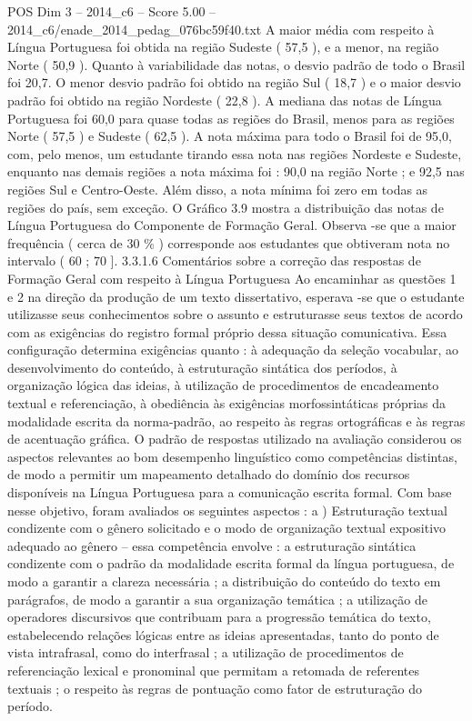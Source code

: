 \begin{textsample}{POS Dim 3 – 2014\_c6 – Score 5.00 – 2014\_c6/enade\_2014\_pedag\_076bc59f40.txt}
A maior média com respeito à Língua Portuguesa foi obtida na região Sudeste ( 57,5 ), e a menor, na região Norte ( 50,9 ).
Quanto à variabilidade das notas, o desvio padrão de todo o Brasil foi 20,7.
O menor desvio padrão foi obtido na região Sul ( 18,7 ) e o maior desvio padrão foi obtido na região Nordeste ( 22,8 ).
A mediana das notas de Língua Portuguesa foi 60,0 para quase todas as regiões do Brasil, menos para as regiões Norte ( 57,5 ) e Sudeste ( 62,5 ).
A nota máxima para todo o Brasil foi de 95,0, com, pelo menos, um estudante tirando essa nota nas regiões Nordeste e Sudeste, enquanto nas demais regiões a nota máxima foi : 90,0 na região Norte ; e 92,5 nas regiões Sul e Centro-Oeste.
Além disso, a nota mínima foi zero em todas as regiões do país, sem exceção.
O Gráfico 3.9 mostra a distribuição das notas de Língua Portuguesa do Componente de Formação Geral.
Observa -se que a maior frequência ( cerca de 30 \% ) corresponde aos estudantes que obtiveram nota no intervalo ( 60 ; 70 ]. 3.3.1.6 Comentários sobre a correção das respostas de Formação Geral com respeito à Língua Portuguesa Ao encaminhar as questões 1 e 2 na direção da produção de um texto dissertativo, esperava -se que o estudante utilizasse seus conhecimentos sobre o assunto e estruturasse seus textos de acordo com as exigências do registro formal próprio dessa situação comunicativa.
Essa configuração determina exigências quanto : à adequação da seleção vocabular, ao desenvolvimento do conteúdo, à estruturação sintática dos períodos, à organização lógica das ideias, à utilização de procedimentos de encadeamento textual e referenciação, à obediência às exigências morfossintáticas próprias da modalidade escrita da norma-padrão, ao respeito às regras ortográficas e às regras de acentuação gráfica.
O padrão de respostas utilizado na avaliação considerou os aspectos relevantes ao bom desempenho linguístico como competências distintas, de modo a permitir um mapeamento detalhado do domínio dos recursos disponíveis na Língua Portuguesa para a comunicação escrita formal.
Com base nesse objetivo, foram avaliados os seguintes aspectos : a ) Estruturação textual condizente com o gênero solicitado e o modo de organização textual expositivo adequado ao gênero – essa competência envolve : a estruturação sintática condizente com o padrão da modalidade escrita formal da língua portuguesa, de modo a garantir a clareza necessária ; a distribuição do conteúdo do texto em parágrafos, de modo a garantir a sua organização temática ; a utilização de operadores discursivos que contribuam para a progressão temática do texto, estabelecendo relações lógicas entre as ideias apresentadas, tanto do ponto de vista intrafrasal, como do interfrasal ; a utilização de procedimentos de referenciação lexical e pronominal que permitam a retomada de referentes textuais ; o respeito às regras de pontuação como fator de estruturação do período.

\end{textsample}
